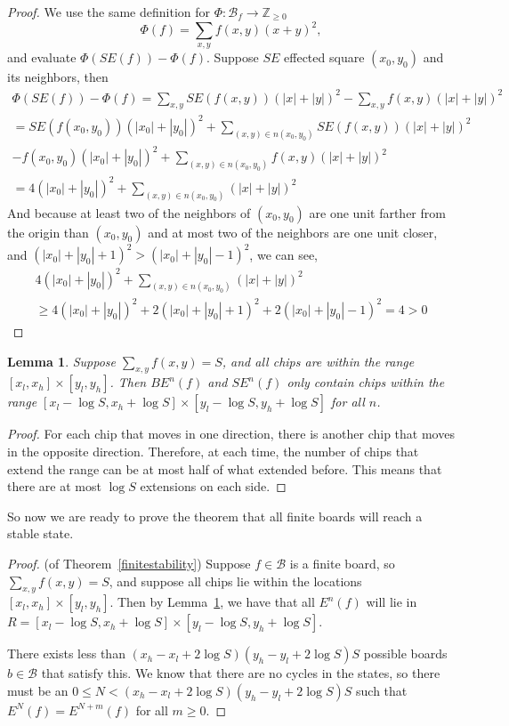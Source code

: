 \documentclass[11pt]{article}
\newtheorem{lemma}{Lemma}
\begin{document}
\begin{proof}
We use the same definition for $\Phi: \mathcal{B}_f \rightarrow \mathbb{Z}_{\geq 0}$ 
\[ \Phi(f) = \sum_{x,y} f(x,y)(x+y)^2, \]
and evaluate $\Phi(SE(f)) - \Phi(f)$. Suppose $SE$ effected square $(x_0,y_0)$ and its neighbors, then
\begin{align}
\Phi(SE(f)) - \Phi(f) =\sum_{x,y} SE(f(x,y))(|x|+|y|)^2 - \sum_{x,y} f(x,y)(|x|+|y|)^2 \\
= SE(f(x_0,y_0))(|x_0|+|y_0|)^2 + \sum_{(x,y) \in n(x_0,y_0)} SE(f(x,y))(|x|+|y|)^2 \\- f(x_0,y_0)(|x_0|+|y_0|)^2 + \sum_{(x,y) \in n(x_0,y_0)} f(x,y)(|x|+|y|)^2 \\
= 4(|x_0| + |y_0|)^2 +\sum_{(x,y) \in n(x_0, y_0)} (|x| + |y|)^2
\end{align}
And because at least two of the neighbors of $(x_0, y_0)$ are one unit farther from the origin than $(x_0, y_0)$ and at most two of the neighbors are one unit closer, and $(|x_0|+|y_0| +1)^2 > (|x_0|+|y_0| - 1)^2$, we can see,
\begin{align}
4(|x_0| + |y_0|)^2 +\sum_{(x,y) \in n(x_0, y_0)} (|x| + |y|)^2  \\ 
\geq 4(|x_0| + |y_0|)^2 + 2 (|x_0| + |y_0|+1)^2 + 2 (|x_0| + |y_0|-1)^2 = 4 >0
\end{align}
\end{proof}


\begin{lemma}
\label{finiteextension}
Suppose $\sum_{x,y} f(x,y) = S$, and all chips are within the range $[x_l, x_h] \times [y_l, y_h]$. Then $BE^n(f)$ and $SE^n(f)$ only contain chips within the range $[x_l - \log S, x_h + \log S] \times [y_l-\log S, y_h+\log S]$ for all $n$.
\end{lemma}

\begin{proof}
For each chip that moves in one direction, there is another chip that moves in the opposite direction. Therefore, at each time, the number of chips that extend the range can be at most half of what extended before. This means that there are at most $\log S$ extensions on each side. 
\end{proof}

So now we are ready to prove the theorem that all finite boards will reach a stable state. 

\begin{proof}
(of Theorem~\ref{finitestability}) Suppose $f \in \mathcal{B}$ is a finite board, so $\sum_{x,y} f(x,y) = S$, and suppose all chips lie within the locations $[x_l, x_h] \times [y_l, y_h]$. Then by Lemma~\ref{finiteextension}, we have that all $E^n(f)$ will lie in $R = [x_l - \log S, x_h + \log S] \times [y_l - \log S, y_h + \log S]$. 

There exists less than $(x_h - x_l + 2\log S)(y_h - y_l + 2\log S)S$ possible boards $b \in \mathcal{B}$ that satisfy this. We know that there are no cycles in the states, so there must be an $0 \leq N < (x_h - x_l + 2\log S)(y_h - y_l + 2\log S)S$ such that $E^N(f) = E^{N+m}(f)$ for all $m \geq 0$.
\end{proof}
\end{document}
